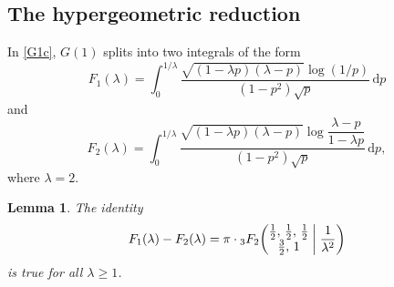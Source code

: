 \documentclass[12pt,reqno]{amsart}
\newtheorem{lemma}{Lemma}
\theoremstyle{remark}
\begin{document}
\subsection{The hypergeometric reduction}

In \eqref{G1c}, $G(1)$ splits into two integrals of the form
$$
F_1(\lambda)
=\int_0^{1/\lambda}\frac{\sqrt{(1-\lambda p)(\lambda-p)}\log(1/p)}{(1-p^2)\sqrt p}\,{{\mathrm d}} p
$$
and
$$
F_2(\lambda)
=\int_0^{1/\lambda}\frac{\sqrt{(1-\lambda p)(\lambda-p)}
\log\dfrac{\lambda-p}{1-\lambda p}}{(1-p^2)\sqrt p}\,{{\mathrm d}} p,
$$
where $\lambda=2$.

\begin{lemma}
\label{lemk1}
The identity
\begin{equation*}
F_1(\lambda)-F_2(\lambda)
=\pi\cdot{}_3F_2\biggl(\begin{matrix} \frac12, \, \frac12, \, \frac12 \\ \frac32, \, 1 \end{matrix}\biggm|
\frac1{\lambda^2}\biggr)
\end{equation*}
is true for all $\lambda\ge1$.
\end{lemma}
\end{document}
